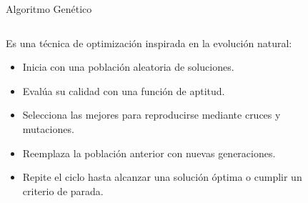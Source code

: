 \documentclass{beamer}
\begin{document}
\begin{frame}{Algoritmo Genético}
    \begin{columns}
        \begin{column}{0.7\textwidth}
            \begin{exampleblock}{Es una técnica de optimización inspirada en la evolución natural:}
                \begin{itemize}[<+-| alert@+>]
                    \item Inicia con una población aleatoria de soluciones.
                    \item Evalúa su calidad con una función de aptitud.
                    \item Selecciona las mejores para reproducirse mediante cruces y mutaciones.
                    \item Reemplaza la población anterior con nuevas generaciones.
                    \item Repite el ciclo hasta alcanzar una solución óptima o cumplir un criterio de parada.
                \end{itemize}
            \end{exampleblock}
        \end{column}
        \begin{column}{0.4\textwidth}
            \begin{figure}
                \centering

\end{figure}
\end{column}
\end{columns}
\end{frame}
\end{document}
